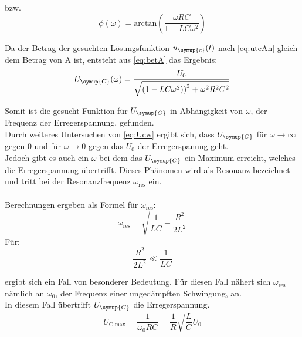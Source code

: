     \noindent bzw.
    \begin{equation}
        \phi (\omega) = \text{arctan}\left(\frac{\omega RC}{1 - LC\omega^2} \right)
        \label{eq:phi}
    \end{equation}

    \noindent Da der Betrag der gesuchten Lösungsfunktion $u_{\symup{c}}(t)$ nach \ref{eq:uteAn} gleich dem Betrag von A ist, entsteht aus 
    \ref{eq:betA} das Ergebnis:
    \begin{equation}
        U_{\symup{C}}(\omega) = \frac{U_0}{\sqrt{\left(1-LC\omega^2)\right)^2 + \omega^2 R^2 C^2}} 
        \label{eq:Ucw}
    \end{equation}

    \noindent Somit ist die gesucht Funktion für $U_{\symup{C}}$ in Abhängigkeit von $\omega$, der Frequenz der Erregerspannung, gefunden.\\
    Durch weiteres Untersuchen von \ref{eq:Ucw} ergibt sich, dass $U_{\symup{C}}$ für $\omega \to \infty $ gegen 0 und für $\omega \to 0$ gegen 
    das $U_0$ der Erregerspanung geht.\\
    Jedoch gibt es auch ein $\omega$ bei dem das $U_{\symup{C}}$ ein Maximum erreicht, welches die 
    Erregerspannung übertrifft. Dieses Phänomen wird als Resonanz bezeichnet und tritt bei der Resonanzfrequenz $\omega_{\text{res}}$ ein. \\\\
    \noindent
    Berechnungen ergeben als Formel für $\omega_{\text{res}}$:
    \begin{equation}
        \omega_{\text{res}} = \sqrt{\frac{1}{LC}-\frac{R^2}{2L^2}} \nonumber
    \end{equation}
    \newline
    \noindent
    Für: 
    \begin{equation}
        \frac{R^2}{2L^2} \ll \frac{1}{LC} \nonumber
    \end{equation}

    \noindent ergibt sich ein Fall von besonderer Bedeutung. Für diesen Fall nähert sich $\omega_{\text{res}}$ nämlich an $\omega_0$, der Frequenz einer ungedämpften 
    Schwingung, an.\\
    In diesem Fall übertrifft $U_{\symup{C}}$ die Erregerspannung.
    \begin{equation}
        U_{\text{C,max}} = \frac{1}{\omega_0 RC} = \frac{1}{R} \sqrt{\frac{L}{C}} U_0 \nonumber
    \end{equation}

